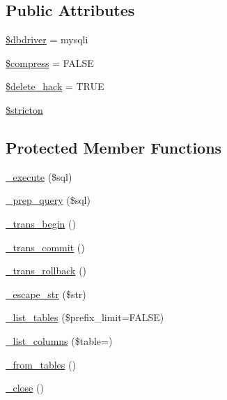 \subsection*{Public Attributes}
\begin{DoxyCompactItemize}
\item 
\mbox{\hyperlink{class_c_i___d_b__mysqli__driver_a0cde2a16322a023d040aa7f725877597}{\$dbdriver}} = \textquotesingle{}mysqli\textquotesingle{}
\item 
\mbox{\hyperlink{class_c_i___d_b__mysqli__driver_abf799de0d30288b91ee73769281dd69d}{\$compress}} = F\+A\+L\+SE
\item 
\mbox{\hyperlink{class_c_i___d_b__mysqli__driver_ad60008f32a478e978c7c3284f320f273}{\$delete\+\_\+hack}} = T\+R\+UE
\item 
\mbox{\hyperlink{class_c_i___d_b__mysqli__driver_afb42d9811bec1da94506e5764e1439e0}{\$stricton}}
\end{DoxyCompactItemize}
\subsection*{Protected Member Functions}
\begin{DoxyCompactItemize}
\item 
\mbox{\hyperlink{class_c_i___d_b__mysqli__driver_a114ab675d89bf8324a41785fb475e86d}{\+\_\+execute}} (\$sql)
\item 
\mbox{\hyperlink{class_c_i___d_b__mysqli__driver_a86af88ef0fa6d44ab4691e3f53270339}{\+\_\+prep\+\_\+query}} (\$sql)
\item 
\mbox{\hyperlink{class_c_i___d_b__mysqli__driver_ac81ac882c1d54347d810199a15856aac}{\+\_\+trans\+\_\+begin}} ()
\item 
\mbox{\hyperlink{class_c_i___d_b__mysqli__driver_a6fe7f373e0b11cfae23a5f41c0b35dda}{\+\_\+trans\+\_\+commit}} ()
\item 
\mbox{\hyperlink{class_c_i___d_b__mysqli__driver_ad49a116b0776c26b53114c9093fd102a}{\+\_\+trans\+\_\+rollback}} ()
\item 
\mbox{\hyperlink{class_c_i___d_b__mysqli__driver_af8ef0237bfcdb19215b63fff769e7a55}{\+\_\+escape\+\_\+str}} (\$str)
\item 
\mbox{\hyperlink{class_c_i___d_b__mysqli__driver_a435c0f3ce54fe7daa178baa8532ebd54}{\+\_\+list\+\_\+tables}} (\$prefix\+\_\+limit=F\+A\+L\+SE)
\item 
\mbox{\hyperlink{class_c_i___d_b__mysqli__driver_a7ccb7f9c301fe7f0a9db701254142b63}{\+\_\+list\+\_\+columns}} (\$table=\textquotesingle{}\textquotesingle{})
\item 
\mbox{\hyperlink{class_c_i___d_b__mysqli__driver_aef43f7e3e7b71d337ff3724c5eb14f10}{\+\_\+from\+\_\+tables}} ()
\item 
\mbox{\hyperlink{class_c_i___d_b__mysqli__driver_a4d9082658000e5ede8312067c6dda9db}{\+\_\+close}} ()
\end{DoxyCompactItemize}
